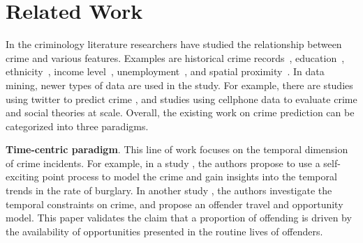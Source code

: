 

\section{Related Work}
\label{ch2-sec:related-work}


In the criminology literature researchers have studied the relationship between crime and various features. Examples are historical crime records~\cite{MSBS+12,WRWS13}, education~\cite{Ehrl75}, ethnicity~\cite{Brai89}, income level~\cite{Patt91}, unemployment~\cite{Free99}, and spatial proximity~\cite{Ans02}. 
In data mining, newer types of data are used in the study. For example, there are studies using twitter to predict crime \cite{WGB12,Gerb14}, and studies using cellphone data \cite{TQC14,Bogo14} to evaluate crime and social theories at scale. 
Overall, the existing work on crime prediction can be categorized into three paradigms.


\vspace{1mm}
\textbf{Time-centric paradigm}. This line of work focuses on the temporal dimension of crime incidents. For example, in a study \cite{MSBS+12}, the authors propose to use a self-exciting point process to model the crime and gain insights into the temporal trends in the rate of burglary. In another study \cite{Ratc06}, the authors investigate the temporal constraints on crime, and propose an offender travel and opportunity model. This paper validates the claim that a proportion of offending is driven by the availability of opportunities presented in the  routine lives of offenders. 



